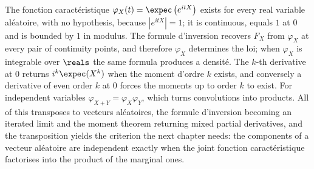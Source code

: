 \begin{conclusion}
The fonction caractéristique $\varphi_{X}(t) = \expec\left(e^{itX}\right)$ exists for every
real variable aléatoire, with no hypothesis, because $\left|e^{itX}\right| = 1$; it is
continuous, equals $1$ at $0$ and is bounded by $1$ in modulus. The formule d'inversion
recovers $F_{X}$ from $\varphi_{X}$ at every pair of continuity points, and therefore
$\varphi_{X}$ determines the loi; when $\varphi_{X}$ is integrable over $\reals$ the same
formula produces a densité. The $k$-th derivative at $0$ returns $i^{k}\expec(X^{k})$ when
the moment d'ordre $k$ exists, and conversely a derivative of even order $k$ at $0$ forces
the moments up to order $k$ to exist. For independent variables $\varphi_{X+Y} =
\varphi_{X}\varphi_{Y}$, which turns convolutions into products. All of this transposes to
vecteurs aléatoires, the formule d'inversion becoming an iterated limit and the moment theorem
returning mixed partial derivatives, and the transposition yields the criterion the next
chapter needs: the components of a vecteur aléatoire are independent exactly when the joint
fonction caractéristique factorises into the product of the marginal ones.
\end{conclusion}

